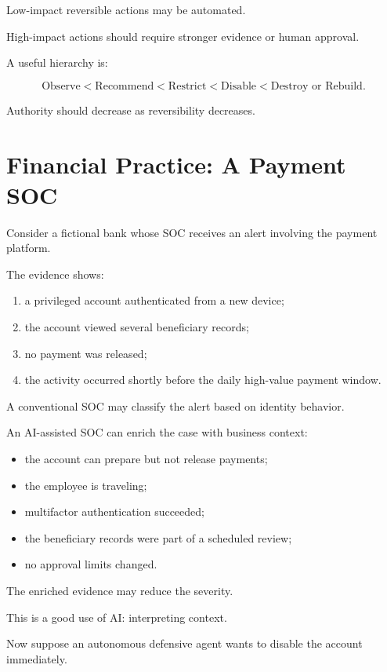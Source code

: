Low-impact reversible actions may be automated.

High-impact actions should require stronger evidence or human approval.

A useful hierarchy is:

\begin{equation}
\text{Observe}
<
\text{Recommend}
<
\text{Restrict}
<
\text{Disable}
<
\text{Destroy or Rebuild}.
\end{equation}

Authority should decrease as reversibility decreases.

\section{Financial Practice: A Payment SOC}

Consider a fictional bank whose SOC receives an alert involving the payment platform.

The evidence shows:

\begin{enumerate}
    \item a privileged account authenticated from a new device;
    \item the account viewed several beneficiary records;
    \item no payment was released;
    \item the activity occurred shortly before the daily high-value payment window.
\end{enumerate}

A conventional SOC may classify the alert based on identity behavior.

An AI-assisted SOC can enrich the case with business context:

\begin{itemize}
    \item the account can prepare but not release payments;
    \item the employee is traveling;
    \item multifactor authentication succeeded;
    \item the beneficiary records were part of a scheduled review;
    \item no approval limits changed.
\end{itemize}

The enriched evidence may reduce the severity.

This is a good use of AI: interpreting context.

Now suppose an autonomous defensive agent wants to disable the account immediately.

